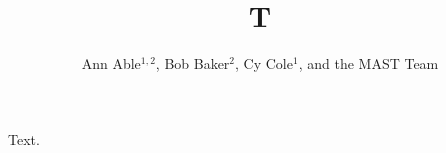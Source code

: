 \documentclass[12pt]{iopart}
\begin{document}
\title{T}
\author{Ann Able$^{1,2}$, Bob Baker$^{2}$, Cy Cole$^{1}$, and the MAST Team}
\address{$^{1}$Univ A}
\address{$^{2}$Univ B}
\maketitle
Text.
\end{document}
